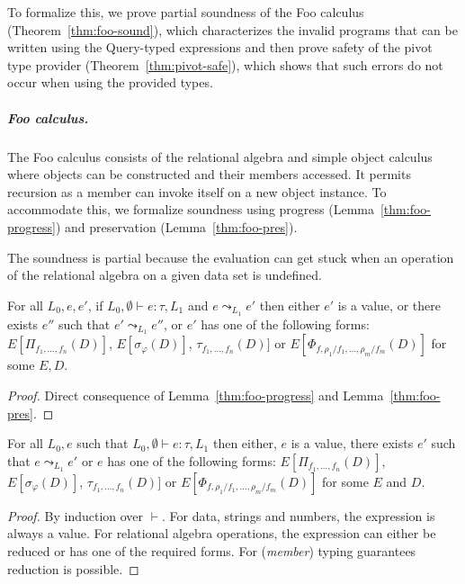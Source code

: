 \documentclass[a4paper,UKenglish]{lipics-v2016}
\theoremstyle{plain}
\theoremstyle{definition}
\newcommand{\ident}[1]{\textnormal{\sffamily #1}}
\begin{document}
To formalize this, we prove partial soundness of the Foo calculus (Theorem~\ref{thm:foo-sound}),
which characterizes the invalid programs that can be written using the \ident{Query}-typed 
expressions and then prove safety of the pivot type provider (Theorem~\ref{thm:pivot-safe}),
which shows that such errors do not occur when using the provided types. 

\subparagraph{Foo calculus.} The Foo calculus consists of the relational algebra and simple object
calculus where objects can be constructed and their members accessed. It permits recursion as a
member can invoke itself on a new object instance. To accommodate this, we formalize soundness 
using progress (Lemma~\ref{thm:foo-progress}) and preservation (Lemma~\ref{thm:foo-pres}). 

The soundness is partial because the evaluation can get stuck when an operation of the relational 
algebra on a given data set is undefined. 

\begin{theorem}
\label{thm:foo-sound}
For all $L_0, e, e'$, if $L_0, \emptyset \vdash e : \tau, L_1$ and $e\leadsto_{L_1} e'$ 
then either $e'$ is a value, or there exists $e''$ such that $e'\leadsto_{L_1} e''$, or
$e'$ has one of the following forms:
$E[\Pi_{f_1, \ldots, f_n}(D)]$, $E[\sigma_\varphi(D)]$, $\tau_{f_1, \ldots, f_n}(D)]$ or 
$E[\Phi_{f, \rho_1/f_1, \ldots, \rho_m/f_m} (D)]$ for some $E, D$.
\end{theorem}
\begin{proof}
Direct consequence of Lemma~\ref{thm:foo-progress} and Lemma~\ref{thm:foo-pres}.
\end{proof}

\begin{lemma}
\label{thm:foo-progress}
For all $L_0, e$ such that $L_0, \emptyset \vdash e : \tau, L_1$ then either, $e$ is a value,
there exists $e'$ such that $e\leadsto_{L_1} e'$ or $e$ has one of
the following forms: $E[\Pi_{f_1, \ldots, f_n}(D)]$, $E[\sigma_\varphi(D)]$, $\tau_{f_1, \ldots, f_n}(D)]$ 
or $E[\Phi_{f, \rho_1/f_1, \ldots, \rho_m/f_m} (D)]$ for some $E$ and $D$.
\end{lemma}
\begin{proof}
By induction over $\vdash$. For data, strings and numbers, the expression is always a value. 
For relational algebra operations, the expression can either be reduced or has one of the required 
forms. For (\emph{member}) typing guarantees reduction is possible.
\end{proof}
\end{document}
